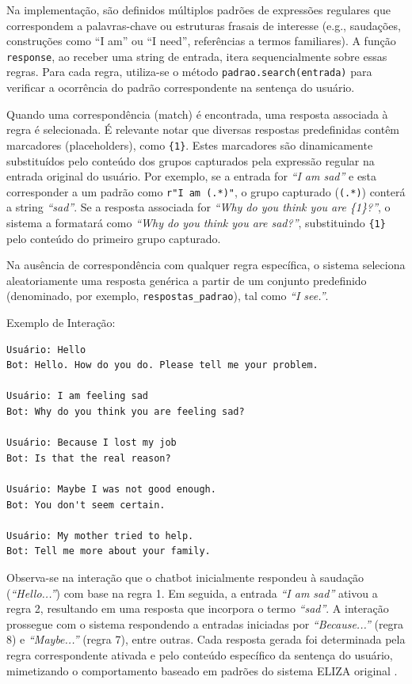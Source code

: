 \documentclass[14pt,a4paper,oneside]{book}
\begin{document}
Na implementação, são definidos múltiplos padrões de expressões regulares que correspondem a palavras-chave ou estruturas frasais de interesse (e.g., saudações, construções como ``I am'' ou ``I need'', referências a termos familiares). A função \texttt{response}, ao receber uma string de entrada, itera sequencialmente sobre essas regras. Para cada regra, utiliza-se o método \texttt{padrao.search(entrada)} para verificar a ocorrência do padrão correspondente na sentença do usuário.

Quando uma correspondência (match) é encontrada, uma resposta associada à regra é selecionada. É relevante notar que diversas respostas predefinidas contêm marcadores (placeholders), como \texttt{\{1\}}. Estes marcadores são dinamicamente substituídos pelo conteúdo dos grupos capturados pela expressão regular na entrada original do usuário. Por exemplo, se a entrada for \textit{``I am sad''} e esta corresponder a um padrão como \texttt{r"I am (.*)"}, o grupo capturado (\texttt{(.*)}) conterá a string \textit{``sad''}. Se a resposta associada for \textit{``Why do you think you are \{1\}?''}, o sistema a formatará como \textit{``Why do you think you are sad?''}, substituindo \texttt{\{1\}} pelo conteúdo do primeiro grupo capturado.

Na ausência de correspondência com qualquer regra específica, o sistema seleciona aleatoriamente uma resposta genérica a partir de um conjunto predefinido (denominado, por exemplo, \texttt{respostas\_padrao}), tal como \textit{``I see.''}.

Exemplo de Interação:


\begin{lstlisting}
Usuário: Hello
Bot: Hello. How do you do. Please tell me your problem.

Usuário: I am feeling sad
Bot: Why do you think you are feeling sad?

Usuário: Because I lost my job
Bot: Is that the real reason?

Usuário: Maybe I was not good enough.
Bot: You don't seem certain.

Usuário: My mother tried to help.
Bot: Tell me more about your family.
\end{lstlisting}

Observa-se na interação que o chatbot inicialmente respondeu à saudação (\textit{``Hello...''}) com base na regra 1. Em seguida, a entrada \textit{``I am sad''} ativou a regra 2, resultando em uma resposta que incorpora o termo \textit{``sad''}. 
A interação prossegue com o sistema respondendo a entradas iniciadas por \textit{``Because...''} (regra 8) e \textit{``Maybe...''} (regra 7), entre outras. 
Cada resposta gerada foi determinada pela regra correspondente ativada e pelo conteúdo específico da sentença do usuário, mimetizando o comportamento baseado em padrões do sistema ELIZA original \cite{Abdul-Kader2015}.
\end{document}
